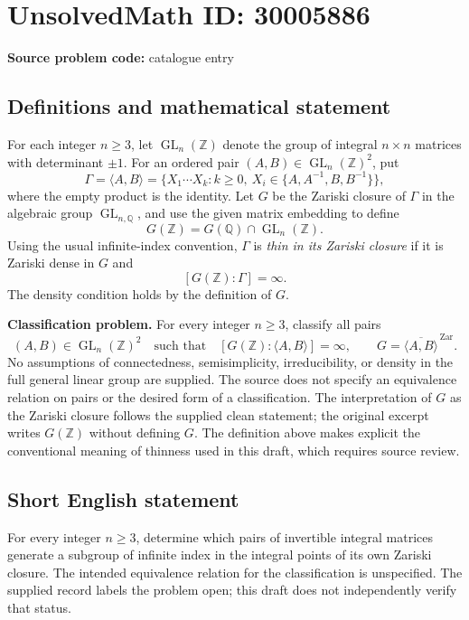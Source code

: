 \documentclass[11pt]{article}
\newcommand{\Z}{\mathbb{Z}}
\newcommand{\Q}{\mathbb{Q}}
\begin{document}
\section*{UnsolvedMath ID: 30005886}
\textbf{Source problem code:} catalogue entry
\subsection{Definitions and mathematical statement}
For each integer \(n\geq 3\), let \(\operatorname{GL}_n(\Z)\) denote the group of integral \(n\times n\) matrices with determinant \(\pm1\). For an ordered pair \((A,B)\in\operatorname{GL}_n(\Z)^2\), put
\[
\Gamma=\langle A,B\rangle
=\{X_1\cdots X_k:k\geq0,\ X_i\in\{A,A^{-1},B,B^{-1}\}\},
\]
where the empty product is the identity. Let \(G\) be the Zariski closure of \(\Gamma\) in the algebraic group \(\operatorname{GL}_{n,\Q}\), and use the given matrix embedding to define
\[
G(\Z)=G(\Q)\cap\operatorname{GL}_n(\Z).
\]
Using the usual infinite-index convention, \(\Gamma\) is \emph{thin in its Zariski closure} if it is Zariski dense in \(G\) and
\[
[G(\Z):\Gamma]=\infty.
\]
The density condition holds by the definition of \(G\).

\textbf{Classification problem.} For every integer \(n\geq3\), classify all pairs
\[
(A,B)\in\operatorname{GL}_n(\Z)^2
\quad\text{such that}\quad
[G(\Z):\langle A,B\rangle]=\infty,
\qquad G=\overline{\langle A,B\rangle}^{\,\mathrm{Zar}}.
\]
No assumptions of connectedness, semisimplicity, irreducibility, or density in the full general linear group are supplied. The source does not specify an equivalence relation on pairs or the desired form of a classification. The interpretation of \(G\) as the Zariski closure follows the supplied clean statement; the original excerpt writes \(G(\Z)\) without defining \(G\). The definition above makes explicit the conventional meaning of thinness used in this draft, which requires source review.
\subsection{Short English statement}
For every integer \(n\geq3\), determine which pairs of invertible integral matrices generate a subgroup of infinite index in the integral points of its own Zariski closure. The intended equivalence relation for the classification is unspecified. The supplied record labels the problem open; this draft does not independently verify that status.
\end{document}
